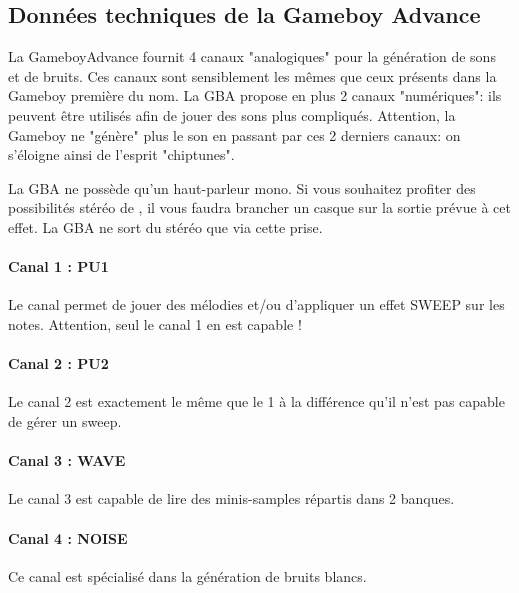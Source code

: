 \subsection{Données techniques de la Gameboy Advance}

La GameboyAdvance fournit 4 canaux "analogiques" pour la génération de sons et de bruits.
Ces canaux sont sensiblement les mêmes que ceux présents dans la Gameboy première du nom.
La GBA propose en plus 2 canaux "numériques": ils peuvent être utilisés afin de jouer des sons plus compliqués.
Attention, la Gameboy ne "génère" plus le son en passant par ces 2 derniers canaux: on s'éloigne ainsi de l'esprit "chiptunes".

La GBA ne possède qu'un haut-parleur mono.
Si vous souhaitez profiter des possibilités stéréo de \FAT, il vous faudra brancher un casque sur la sortie prévue à cet effet.
La GBA ne sort du stéréo que via cette prise.

\paragraph{Canal 1 : PU1} Le canal permet de jouer des mélodies et/ou d'appliquer un effet SWEEP sur les notes. Attention, seul le canal 1 en est capable !


\paragraph{Canal 2 : PU2} Le canal 2 est exactement le même que le 1 à la différence qu'il n'est pas capable de gérer un sweep.


\paragraph{Canal 3 : WAVE} Le canal 3 est capable de lire des minis-samples répartis dans 2 banques.


\paragraph{Canal 4 : NOISE} Ce canal est spécialisé dans la génération de bruits blancs.

